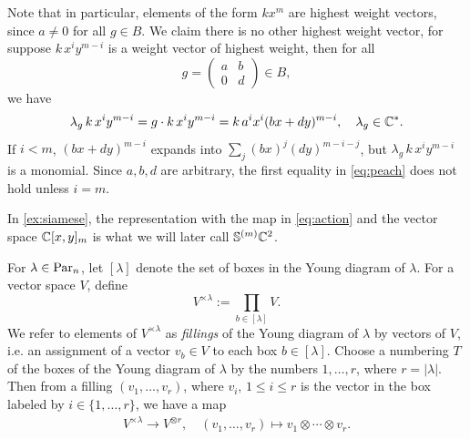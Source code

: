 \documentclass[11pt]{amsart}
\begin{document}
\begin{eg}
Note that in particular, elements of the form $k x^m$ are highest weight vectors, since $a \neq 0$ for all $g \in B$. We claim there is no other highest weight vector, for suppose $k\,x^iy^{m - i}$ is a weight vector of highest weight, then for all
\begin{equation*}
    g=\begin{pmatrix}
         a & b \\
         0 & d
     \end{pmatrix} \in B,
\end{equation*}
we have 
\begin{equation}
    \lambda_g \, k\,x^iy^{m - i} =  g \cdot k\,x^iy^{m - i} = k\,a^ix^i(bx+dy)^{m-i}, \quad \lambda_g \in \mathbb{C}^*. \label{eq:peach}
\end{equation}
If $i<m$, $(bx+dy)^{m-i}$ expands into $\sum_j (bx)^j (dy)^{m-i-j}$, but $\lambda_g \, k\,x^iy^{m - i}$ is a monomial. Since $a, b, d$ are arbitrary, the first equality in \cref{eq:peach} does not hold unless $i=m$.
\end{eg}
In \cref{ex:siamese}, the representation with the map in \cref{eq:action} and the vector space $\mathbb{C}[x, y]_m$ is what we will later call \(\mathbb{S}^{(m)} \mathbb{C}^2\). 


For \(\lambda\in\mathrm{Par}_n\), let \([\lambda]\) denote the set of boxes in the
Young diagram of \(\lambda\). For a vector space \(V\), define
\[
    V^{\times\lambda}:=\prod_{b\in[\lambda]} V .
\]
We refer to elements of \(V^{\times\lambda}\) as \emph{fillings} of the Young diagram
of \(\lambda\) by vectors of \(V\), i.e. an assignment of a vector \(v_b\in V\)
to each box \(b\in[\lambda]\). Choose a numbering $T$ of the boxes of the Young diagram of $\lambda$ by the numbers $1,\dotsc,r$, where \(r = |\lambda|\). Then from a filling $(v_1, \dots, v_r)$, where $v_i, \, 1\leq i \leq r$ is the vector in the box labeled by $i \in \{1, \dots, r\}$, we have a map 
\begin{align}
    V^{\times \lambda} \longrightarrow V^{\otimes r}, \quad (v_1, \dots, v_r) \longmapsto v_1 \otimes \cdots \otimes v_r.
\end{align}
\end{document}
